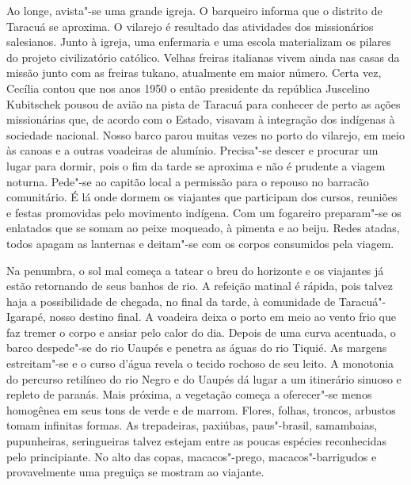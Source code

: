 Ao longe, avista"-se uma grande igreja. O barqueiro informa que o
distrito de Taracuá se aproxima. O vilarejo é resultado das atividades
dos missionários salesianos. Junto à igreja, uma enfermaria e uma escola
materializam os pilares do projeto civilizatório católico. Velhas
freiras italianas vivem ainda nas casas da missão junto com as freiras
tukano, atualmente em maior número. Certa vez, Cecília contou que nos
anos 1950 o então presidente da república Juscelino Kubitschek pousou de
avião na pista de Taracuá para conhecer de perto as ações missionárias
que, de acordo com o Estado, visavam à integração dos indígenas à
sociedade nacional. Nosso barco parou muitas vezes no porto do vilarejo,
em meio às canoas e a outras voadeiras de alumínio. Precisa"-se descer e
procurar um lugar para dormir, pois o fim da tarde se aproxima e não é
prudente a viagem noturna. Pede"-se ao capitão local a permissão para o
repouso no barracão comunitário. É lá onde dormem os viajantes que
participam dos cursos, reuniões e festas promovidas pelo movimento
indígena. Com um fogareiro preparam"-se os enlatados que se somam ao
peixe moqueado, à pimenta e ao beiju. Redes atadas, todos apagam as
lanternas e deitam"-se com os corpos consumidos pela viagem.

Na penumbra, o sol mal começa a tatear o breu do horizonte e os
viajantes já estão retornando de seus banhos de rio. A refeição matinal
é rápida, pois talvez haja a possibilidade de chegada, no final da
tarde, à comunidade de Taracuá"-Igarapé, nosso destino final. A voadeira
deixa o porto em meio ao vento frio que faz tremer o corpo e ansiar pelo
calor do dia. Depois de uma curva acentuada, o barco despede"-se do rio
Uaupés e penetra as águas do rio Tiquié. As margens estreitam"-se e o
curso d'água revela o tecido rochoso de seu leito. A monotonia do
percurso retilíneo do rio Negro e do Uaupés dá lugar a um itinerário
sinuoso e repleto de paranás. Mais próxima, a vegetação começa a
oferecer"-se menos homogênea em seus tons de verde e de marrom. Flores,
folhas, troncos, arbustos tomam infinitas formas. As trepadeiras,
paxiúbas, paus"-brasil, samambaias, pupunheiras, seringueiras talvez
estejam entre as poucas espécies reconhecidas pelo principiante. No alto
das copas, macacos"-prego, macacos"-barrigudos e provavelmente uma
preguiça se mostram ao viajante.

